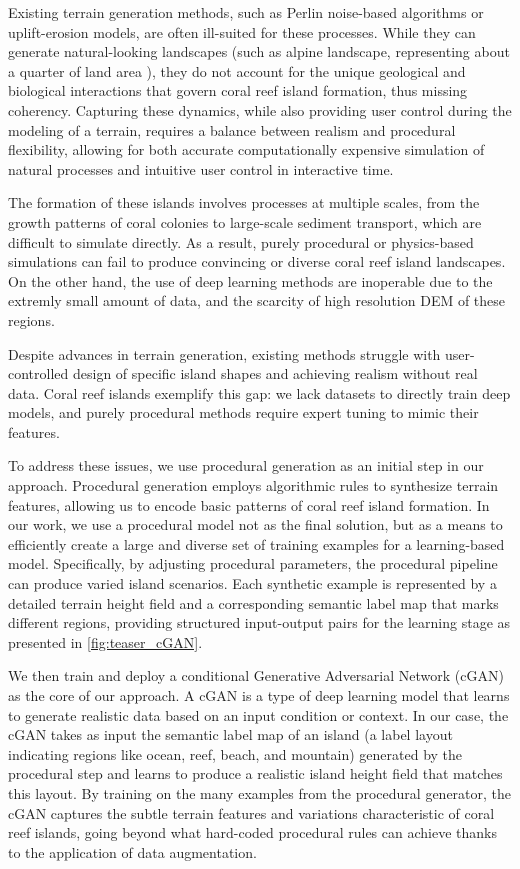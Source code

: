 Existing terrain generation methods, such as Perlin noise-based algorithms or uplift-erosion models, are often ill-suited for these processes. While they can generate natural-looking landscapes (such as alpine landscape, representing about a quarter of land area \cite{Korner2014}), they do not account for the unique geological and biological interactions that govern coral reef island formation, thus missing coherency. Capturing these dynamics, while also providing user control during the modeling of a terrain, requires a balance between realism and procedural flexibility, allowing for both accurate computationally expensive simulation of natural processes and intuitive user control in interactive time.

The formation of these islands involves processes at multiple scales, from the growth patterns of coral colonies to large-scale sediment transport, which are difficult to simulate directly. As a result, purely procedural or physics-based simulations can fail to produce convincing or diverse coral reef island landscapes. On the other hand, the use of deep learning methods are inoperable due to the extremly small amount of data, and the scarcity of high resolution DEM of these regions.

Despite advances in terrain generation, existing methods struggle with user-controlled design of specific island shapes and achieving realism without real data. Coral reef islands exemplify this gap: we lack datasets to directly train deep models, and purely procedural methods require expert tuning to mimic their features.

To address these issues, we use procedural generation as an initial step in our approach. Procedural generation employs algorithmic rules to synthesize terrain features, allowing us to encode basic patterns of coral reef island formation. In our work, we use a procedural model not as the final solution, but as a means to efficiently create a large and diverse set of training examples for a learning-based model. Specifically, by adjusting procedural parameters, the procedural pipeline can produce varied island scenarios. Each synthetic example is represented by a detailed terrain height field and a corresponding semantic label map that marks different regions, providing structured input-output pairs for the learning stage as presented in \cref{fig:teaser_cGAN}.

We then train and deploy a conditional Generative Adversarial Network (cGAN) as the core of our approach. A cGAN is a type of deep learning model that learns to generate realistic data based on an input condition or context. In our case, the cGAN takes as input the semantic label map of an island (a label layout indicating regions like ocean, reef, beach, and mountain) generated by the procedural step and learns to produce a realistic island height field that matches this layout. By training on the many examples from the procedural generator, the cGAN captures the subtle terrain features and variations characteristic of coral reef islands, going beyond what hard-coded procedural rules can achieve thanks to the application of data augmentation.

